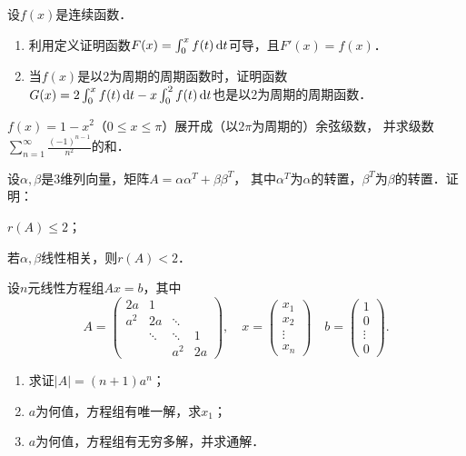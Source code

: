 \documentclass[plain,noanswer,medmath]{../../template/jnuexam}
\begin{document}
\begin{problem}[points=10]
设$f(x)$是连续函数．
\begin{enumerate}
\item 利用定义证明函数$F(x) = \int_0^x f(t)\mathop{}\!\mathrm{d} t$可导，且$F'(x) = f(x)$．
\item 当$f(x)$是以$2$为周期的周期函数时，证明函数
      $G(x) = 2\int_0^x f(t)\mathop{}\!\mathrm{d} t - x\int_0^2 f(t)\mathop{}\!\mathrm{d} t$也是以$2$为周期的周期函数．
\end{enumerate}
\end{problem}


\begin{problem}[points=11]
$f(x) = 1 - x^2$（$0 \le x \le \pi$）展开成（以$2\pi$为周期的）余弦级数，
并求级数$\sum_{n = 1}^{\infty}\frac{(- 1)^{n - 1}}{n^2}$的和．
\end{problem}


\begin{problem}[points=10]
设$\alpha ,\beta$是$3$维列向量，矩阵$A = \alpha \alpha^T + \beta \beta^T$，
其中$\alpha^T$为$\alpha$的转置，$\beta^T$为$\beta$的转置．证明：\par
\begin{enumerate*}
\item $r(A) \le 2$；
\item 若$\alpha ,\beta$线性相关，则$r(A) < 2$．
\end{enumerate*}
\end{problem}


\begin{problem}[points=12]
设$n$元线性方程组$Ax = b$，其中
$$A = \begin{pmatrix}
   2a &      1 &        & \\
  a^2 &     2a & \ddots & \\
      & \ddots & \ddots & 1 \\
      &        &    a^2 & 2a
\end{pmatrix},\quad x = \begin{pmatrix}
  x_1 \\
  x_2 \\
  \vdots \\
  x_n
\end{pmatrix}\quad b = \begin{pmatrix}
  1 \\
  0 \\
  \vdots \\
  0
\end{pmatrix}.$$
\begin{enumerate}
\item 求证$|A| = \left(n + 1 \right) a^n$；
\item $a$为何值，方程组有唯一解，求$x_1$；
\item $a$为何值，方程组有无穷多解，并求通解．
\end{enumerate}
\end{problem}
\end{document}

